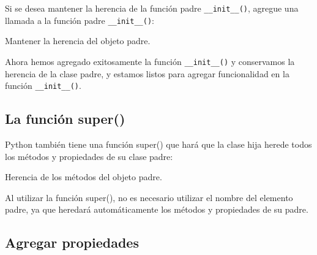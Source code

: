 Si se desea mantener la herencia de la función padre \texttt{\_\_init\_\_()}, agregue una llamada a la función padre \texttt{\_\_init\_\_()}:\\

\begin{code} Mantener la herencia del objeto padre.

\begin{Shaded}
\begin{Highlighting}[]
   \NormalTok{(}
\NormalTok{(}
\end{Highlighting}
\end{Shaded}
\end{code}

Ahora hemos agregado exitosamente la función \texttt{\_\_init\_\_()} y
conservamos la herencia de la clase padre, y estamos listos para agregar
funcionalidad en la función \texttt{\_\_init\_\_()}.

\subsection{La función super()}

Python también tiene una función super() que hará que la clase hija
herede todos los métodos y propiedades de su clase padre: \\

\begin{code} Herencia de los métodos del objeto padre.
\begin{Shaded}
\begin{Highlighting}[]
   \NormalTok{(}

\end{Highlighting}
\end{Shaded}
\end{code}

Al utilizar la función super(), no es necesario utilizar el nombre del
elemento padre, ya que heredará automáticamente los métodos y
propiedades de su padre.

\subsection{Agregar propiedades}

